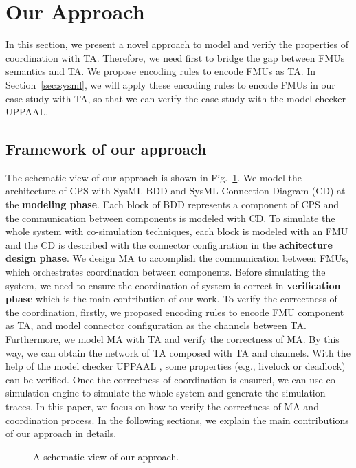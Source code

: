 \section{Our Approach}
In this section, we present a novel approach to model and verify the properties of coordination with TA. Therefore, we need first to bridge the gap between FMUs semantics and TA. We propose encoding rules to encode FMUs as TA. In Section~\ref{sec:sysml}, we will apply these encoding rules to encode FMUs in our case study with TA, so that we can verify the case study with the model checker UPPAAL.
\label{sec:encoding}
\subsection{Framework of our approach}
The schematic view of our approach is shown in Fig.~\ref{paper-arc}. We model the architecture of CPS with SysML BDD and SysML Connection Diagram (CD) at the \textbf{modeling phase}. Each block of BDD represents a component of CPS and the communication between components is modeled with CD. To simulate the whole system with co-simulation techniques, each block is modeled with an FMU and the CD is described with the connector configuration in the \textbf{achitecture design phase}. We design MA to accomplish the communication between FMUs, which orchestrates coordination between components. Before simulating the system, we need to ensure the coordination of system is correct in \textbf{verification phase} which is the main contribution of our work. To verify the correctness of the coordination, firstly, we proposed encoding rules to encode FMU component as TA, and model connector configuration as the channels between TA. Furthermore, we model MA with TA and verify the correctness of MA. By this way, we can obtain the network of TA composed with TA and channels. With the help of the model checker UPPAAL \cite{BehrmannDLHPYH06}, some properties (e.g., livelock or deadlock) can be verified. Once the correctness of coordination is ensured, we can use co-simulation engine to simulate the whole system and generate the simulation traces. In this paper, we focus on how to verify the correctness of MA and coordination process. In the following sections, we explain the main contributions of our approach in details.
\begin{figure}[htbp]
	\caption{A schematic view of our approach.}
	\label{paper-arc}
\end{figure}

